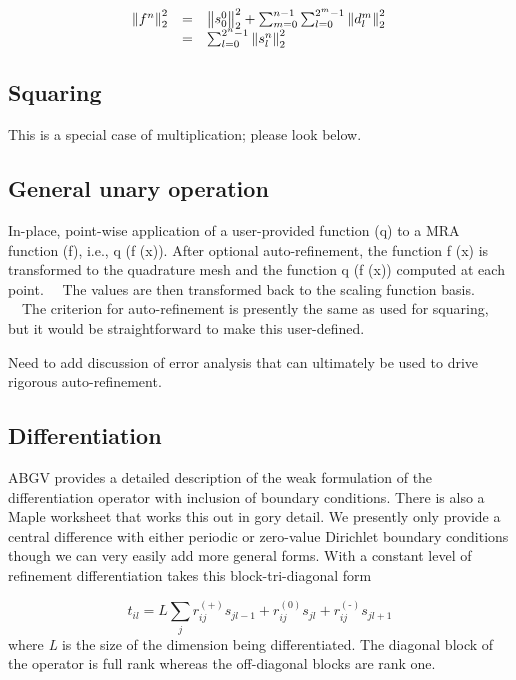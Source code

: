 \documentclass[letterpaper]{article}
\begin{document}
\begin{equation}
\begin{matrix}\hfill \left\|f^{n}\right\|_{2}^{2}&\text{=}&\left\|s_{0}^{0}\right\|_{2}^{2}+\sum _{m=0}^{n-1}\sum
_{l=0}^{2^{m}-1}\left\|d_{l}^{m}\right\|_{2}^{2}\hfill\null \\&\text{=}&\sum
_{l=0}^{2^{n}-1}\left\|s_{l}^{n}\right\|_{2}^{2}\hfill\null \end{matrix}
\end{equation}
\subsection[Squaring]{\rmfamily Squaring}
This is a special case of multiplication; please look below.

\subsection[General unary operation]{\rmfamily General unary operation}
In-place, point-wise application of a user-provided function (q) to a MRA function (f), i.e., q (f (x)). After optional
auto-refinement, the function f (x) is transformed to the quadrature mesh and the function q (f (x)) computed at each
point. \ \ The values are then transformed back to the scaling function basis. \ \ The criterion for auto-refinement is
presently the same as used for squaring, but it would be straightforward to make this user-defined.

Need to add discussion of error analysis that can ultimately be used to drive rigorous auto-refinement.

\subsection{Differentiation}
ABGV provides a detailed description of the weak formulation of the differentiation operator with inclusion of boundary
conditions. There is also a Maple worksheet that works this out in gory detail. We presently only provide a central
difference with either periodic or zero-value Dirichlet boundary conditions though we can very easily add more general
forms. With a constant level of refinement differentiation takes this block-tri-diagonal form 

\begin{equation}
t_{il}=L\sum _{j}{r_{ij}^{(\text{+})}s_{jl-1}+r_{ij}^{(0)}s_{jl}+r_{ij}^{(\text{{}-})}s_{jl+1}}
\end{equation}
where \textit{L} is the size of the dimension being differentiated. The diagonal block of the operator is full rank
whereas the off-diagonal blocks are rank one.
\end{document}
